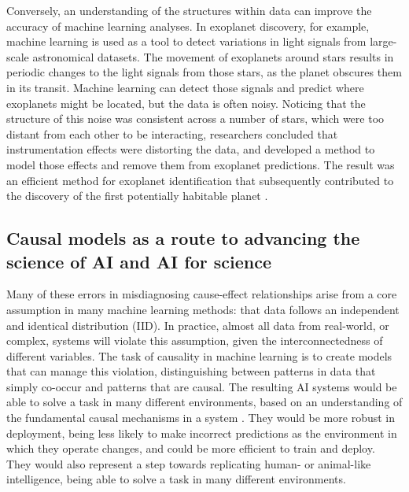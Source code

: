Conversely, an understanding of the structures within data can improve
the accuracy of machine learning analyses. In exoplanet discovery, for
example, machine learning is used as a tool to detect variations in
light signals from large-scale astronomical datasets. The movement of
exoplanets around stars results in periodic changes to the light signals
from those stars, as the planet obscures them in its transit. Machine
learning can detect those signals and predict where exoplanets might be
located, but the data is often noisy. Noticing that the structure of
this noise was consistent across a number of stars, which were too
distant from each other to be interacting, researchers concluded that
instrumentation effects were distorting the data, and developed a method
to model those effects and remove them from exoplanet predictions. The
result was an efficient method for exoplanet identification that
subsequently contributed to the discovery of the first potentially
habitable planet \cite{Scholkopf-causality22}.

\subsection{Causal models as a route to advancing the science of AI and
AI for
science}\label{causal-models-as-a-route-to-advancing-the-science-of-ai-and-ai-for-science}

Many of these errors in misdiagnosing cause-effect relationships arise
from a core assumption in many machine learning methods: that data
follows an independent and identical distribution (IID). In practice,
almost all data from real-world, or complex, systems will violate this
assumption, given the interconnectedness of different variables. The
task of causality in machine learning is to create models that can
manage this violation, distinguishing between patterns in data that
simply co-occur and patterns that are causal. The resulting AI systems
would be able to solve a task in many different environments, based on
an understanding of the fundamental causal mechanisms in a
system \cite{Peters-elements17}. They would be more robust in
deployment, being less likely to make incorrect predictions as the
environment in which they operate changes, and could be more efficient
to train and deploy. They would also represent a step towards
replicating human- or animal-like intelligence, being able to solve a
task in many different environments.


